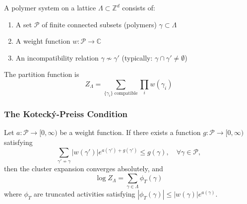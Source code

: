 \begin{definition}
A polymer system on a lattice $\Lambda \subset \mathbb{Z}^d$ consists of:
\begin{enumerate}
    \item A set $\mathcal{P}$ of finite connected subsets (polymers) $\gamma \subset \Lambda$
    \item A weight function $w: \mathcal{P} \to \mathbb{C}$
    \item An incompatibility relation $\gamma \nsim \gamma'$ (typically: $\gamma \cap \gamma' \neq \emptyset$)
\end{enumerate}
The partition function is
\begin{equation}
    Z_\Lambda = \sum_{\{\gamma_i\} \text{ compatible}} \prod_i w(\gamma_i)
\end{equation}
\end{definition}

\subsubsection{The Koteck\'y-Preiss Condition}

\begin{theorem}\label{thm:kp-criterion}
Let $a: \mathcal{P} \to [0, \infty)$ be a weight function. If there exists a function $g: \mathcal{P} \to [0, \infty)$ satisfying
\begin{equation}
    \sum_{\gamma' \nsim \gamma} |w(\gamma')| e^{a(\gamma') + g(\gamma')} \leq g(\gamma), \quad \forall \gamma \in \mathcal{P},
\end{equation}
then the cluster expansion converges absolutely, and
\begin{equation}
    \log Z_\Lambda = \sum_{\gamma \in \Lambda} \phi_T(\gamma)
\end{equation}
where $\phi_T$ are truncated activities satisfying $|\phi_T(\gamma)| \leq |w(\gamma)| e^{a(\gamma)}$.
\end{theorem}

